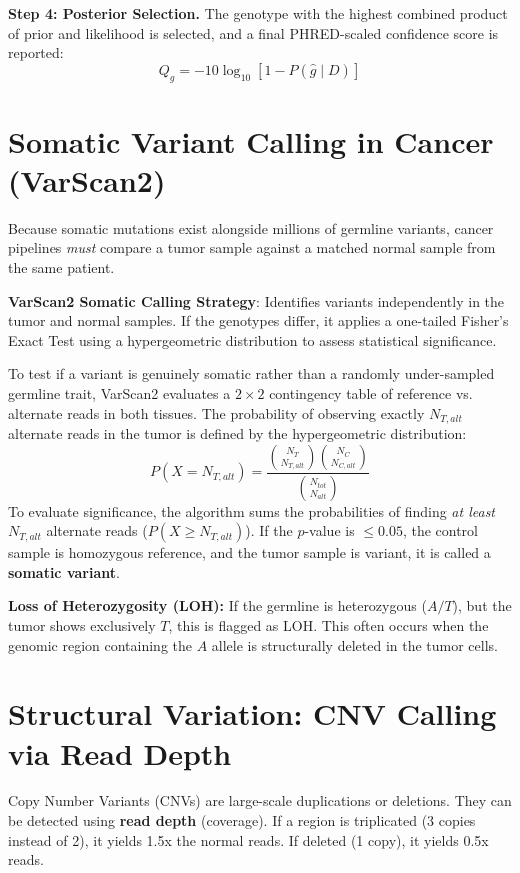 \documentclass[11pt,a4paper]{article}
\newcommand{\sta}{\textbf{\textcolor{red}{\sffamily\upshape [!]}} }
\begin{document}
\textbf{Step 4: Posterior Selection.} The genotype with the highest combined product of prior and likelihood is selected, and a final PHRED-scaled confidence score is reported:
\[
Q_g = -10 \log_{10}[1 - P(\hat{g} \mid D)]
\]

\section{Somatic Variant Calling in Cancer (VarScan2)}
Because somatic mutations exist alongside millions of germline variants, cancer pipelines \textit{must} compare a tumor sample against a matched normal sample from the same patient. 

\begin{important}
    \textbf{VarScan2 Somatic Calling Strategy}: Identifies variants independently in the tumor and normal samples. If the genotypes differ, it applies a one-tailed Fisher's Exact Test using a hypergeometric distribution to assess statistical significance.
\end{important}

To test if a variant is genuinely somatic rather than a randomly under-sampled germline trait, VarScan2 evaluates a $2 \times 2$ contingency table of reference vs. alternate reads in both tissues. 
The probability of observing exactly $N_{T,alt}$ alternate reads in the tumor is defined by the hypergeometric distribution:
\[
P(X = N_{T,alt}) = \frac{\binom{N_T}{N_{T,alt}} \binom{N_C}{N_{C,alt}}}{\binom{N_{tot}}{N_{alt}}}
\]
To evaluate significance, the algorithm sums the probabilities of finding \textit{at least} $N_{T,alt}$ alternate reads ($P(X \geq N_{T,alt})$). If the $p$-value is $\leq 0.05$, the control sample is homozygous reference, and the tumor sample is variant, it is called a \textbf{somatic variant}.

\sta \textbf{Loss of Heterozygosity (LOH):} If the germline is heterozygous ($A/T$), but the tumor shows exclusively $T$, this is flagged as LOH. This often occurs when the genomic region containing the $A$ allele is structurally deleted in the tumor cells.

\section{Structural Variation: CNV Calling via Read Depth}
Copy Number Variants (CNVs) are large-scale duplications or deletions. They can be detected using \textbf{read depth} (coverage). If a region is triplicated (3 copies instead of 2), it yields 1.5x the normal reads. If deleted (1 copy), it yields 0.5x reads.
\end{document}
